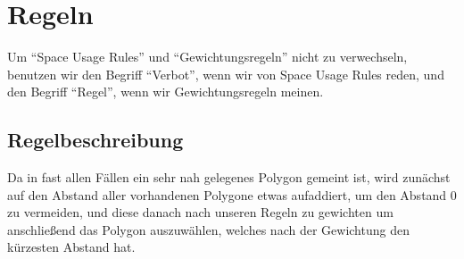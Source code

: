 \section{Regeln}
\label{sec:Regeln}
Um ``Space Usage Rules'' und ``Gewichtungsregeln'' nicht zu verwechseln, benutzen wir den Begriff ``Verbot'', wenn wir von
Space Usage Rules reden, und den Begriff ``Regel'', wenn wir Gewichtungsregeln meinen.
\subsection{Regelbeschreibung}
Da in fast allen Fällen ein sehr nah gelegenes Polygon gemeint ist, wird zunächst auf den Abstand aller vorhandenen Polygone etwas aufaddiert,
um den Abstand 0 zu vermeiden, und diese danach nach unseren Regeln zu gewichten um anschließend das Polygon auszuwählen,
welches nach der Gewichtung den kürzesten Abstand hat.



